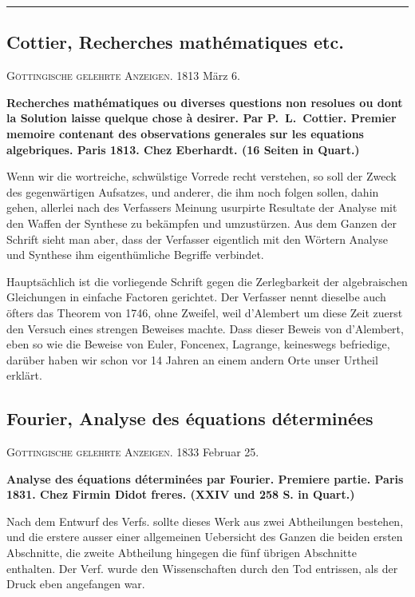 \documentclass[12pt,a4paper]{article}
\newcommand{\1}{\ensuremath{\mathrlap{\,|\,}}} %
\begin{document}
\medskip
\noindent\rule{\textwidth}{0.4pt}

\subsection*{Cottier, Recherches mathématiques etc.}

\noindent\textsc{Göttingische gelehrte Anzeigen.} 1813 März 6.

\smallskip
\noindent\textbf{Recherches mathématiques ou diverses questions non resolues ou dont la Solution laisse quelque chose à desirer. Par P.~L.~Cottier. Premier memoire contenant des observations generales sur les equations algebriques. Paris 1813. Chez Eberhardt. (16 Seiten in Quart.)}

Wenn wir die wortreiche, schwülstige Vorrede recht verstehen, so soll der Zweck des gegenwärtigen Aufsatzes, und anderer, die ihm noch folgen sollen, dahin gehen, allerlei nach des Verfassers Meinung usurpirte Resultate der Analyse mit den Waffen der Synthese zu bekämpfen und umzustürzen. Aus dem Ganzen der Schrift sieht man aber, dass der Verfasser eigentlich mit den Wörtern Analyse und Synthese ihm eigenthümliche Begriffe verbindet.

Hauptsächlich ist die vorliegende Schrift gegen die Zerlegbarkeit der algebraischen Gleichungen in einfache Factoren gerichtet. Der Verfasser nennt dieselbe auch öfters das Theorem von 1746, ohne Zweifel, weil d'Alembert um diese Zeit zuerst den Versuch eines strengen Beweises machte. Dass dieser Beweis von d'Alembert, eben so wie die Beweise von Euler, Foncenex, Lagrange, keineswegs befriedige, darüber haben wir schon vor 14 Jahren an einem andern Orte unser Urtheil erklärt.

\subsection*{Fourier, Analyse des équations déterminées}

\noindent\textsc{Göttingische gelehrte Anzeigen.} 1833 Februar 25.

\smallskip
\noindent\textbf{Analyse des équations déterminées par Fourier. Premiere partie. Paris 1831. Chez Firmin Didot freres. (XXIV und 258 S. in Quart.)}

Nach dem Entwurf des Verfs. sollte dieses Werk aus zwei Abtheilungen bestehen, und die erstere ausser einer allgemeinen Uebersicht des Ganzen die beiden ersten Abschnitte, die zweite Abtheilung hingegen die fünf übrigen Abschnitte enthalten. Der Verf. wurde den Wissenschaften durch den Tod entrissen, als der Druck eben angefangen war.
\end{document}
